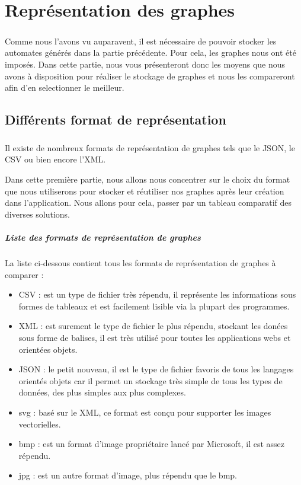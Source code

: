 \chapter{Représentation des graphes}
\paragraph{}

\cite{CoursClavier2010}

Comme nous l'avons vu auparavent, il est nécessaire de pouvoir stocker les automates générés dans la partie précédente. Pour cela, les graphes nous ont été imposés. Dans cette partie, nous vous présenteront donc les moyens que nous avons à disposition pour réaliser le stockage de graphes et nous les compareront afin d'en selectionner le meilleur.

\section{Différents format de représentation}
  \paragraph{}
  Il existe de nombreux formats de représentation de graphes tels que le JSON, le CSV ou bien encore l'XML.
  
  Dans cette première partie, nous allons nous concentrer sur le choix du format que nous utiliserons pour stocker et réutiliser nos graphes après leur création dans l'application.
  Nous allons pour cela, passer par un tableau comparatif des diverses solutions.
  

  \paragraph{Liste des formats de représentation de graphes}
  La liste ci-dessous contient tous les formats de représentation de graphes à comparer : 
  \begin{itemize}
   \item CSV : est un type de fichier très répendu, il représente les informations sous formes de tableaux et est facilement lisible via la plupart des programmes. 
   \item XML : est surement le type de fichier le plus répendu, stockant les donées sous forme de balises, il est très utilisé pour toutes les applications webs et orientées objets. 
   \item JSON : le petit nouveau, il est le type de fichier favoris de tous les langages orientés objets car il permet un stockage très simple de tous les types de données, des plus simples aux plus complexes. 
   \item svg : basé sur le XML, ce format est conçu pour supporter les images vectorielles.
   \item bmp : est un format d'image propriétaire lancé par Microsoft, il est assez répendu.
   \item jpg : est un autre format d'image, plus répendu que le bmp.
  \end{itemize}

